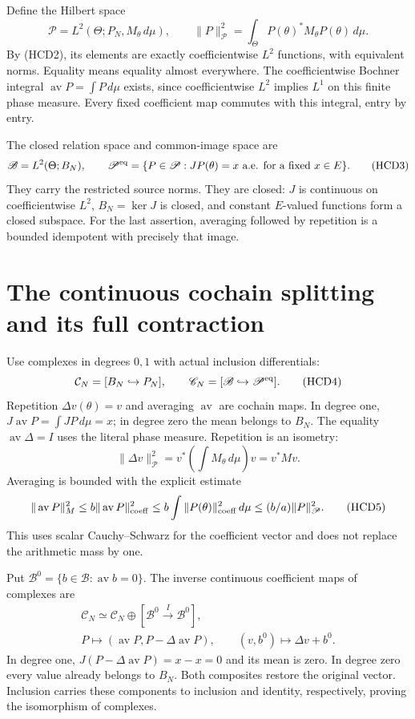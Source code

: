 \documentclass[11pt]{article}
\newcommand{\av}{\operatorname{av}}
\begin{document}
Define the Hilbert space
\[
 \mathscr P=L^2(\Theta;P_N,M_\theta\,d\mu),\qquad
 \|P\|_{\mathscr P}^2=\int_\Theta P(\theta)^*M_\theta
 P(\theta)\,d\mu.
\]
By (HCD2), its elements are exactly coefficientwise $L^2$
functions, with equivalent norms. Equality means equality
almost everywhere. The coefficientwise Bochner integral
$\av P=\int P\,d\mu$ exists, since coefficientwise $L^2$
implies $L^1$ on this finite phase measure. Every fixed
coefficient map commutes with this integral, entry by entry.

The closed relation space and common-image space are
\[
 \mathscr B=L^2(\Theta;B_N),\qquad
 \mathscr P^{\rm eq}
 =\{P\in\mathscr P:JP(\theta)=x\text{ a.e. for a fixed }x\in E\}.
 \tag{HCD3}
\]
They carry the restricted source norms. They are closed:
$J$ is continuous on coefficientwise $L^2$, $B_N=\ker J$
is closed, and constant $E$-valued functions form a closed
subspace. For the last assertion, averaging followed by
repetition is a bounded idempotent with precisely that image.

\section{The continuous cochain splitting and its full contraction}

Use complexes in degrees $0,1$ with actual inclusion differentials:
\[
 \mathcal C_N=[B_N\hookrightarrow P_N],\qquad
 \mathscr C_N=[\mathscr B\hookrightarrow\mathscr P^{\rm eq}].
 \tag{HCD4}
\]
Repetition $\Delta v(\theta)=v$ and averaging $\av$ are cochain
maps. In degree one, $J\av P=\int JP\,d\mu=x$; in degree
zero the mean belongs to $B_N$. The equality $\av\Delta=I$
uses the literal phase measure. Repetition is an isometry:
\[
 \|\Delta v\|_{\mathscr P}^2
 =v^*\left(\int M_\theta\,d\mu\right)v=v^*Mv.
\]
Averaging is bounded with the explicit estimate
\[
 \|\av P\|_M^2
 \le b\|\av P\|_{\rm coeff}^2
 \le b\int\|P(\theta)\|_{\rm coeff}^2\,d\mu
 \le (b/a)\|P\|_{\mathscr P}^2.
 \tag{HCD5}
\]
This uses scalar Cauchy--Schwarz for the coefficient vector
and does not replace the arithmetic mass by one.

Put $\mathscr B^0=\{b\in\mathscr B:\av b=0\}$. The inverse
continuous coefficient maps of complexes are
\[
 \begin{gathered}
 \mathscr C_N\simeq
 \mathcal C_N\oplus[\mathscr B^0\xrightarrow{I}\mathscr B^0],\\
 P\longmapsto(\av P,P-\Delta\av P),\qquad
 (v,b^0)\longmapsto\Delta v+b^0.
 \end{gathered}
 \tag{HCD6}
\]
In degree one, $J(P-\Delta\av P)=x-x=0$ and its mean is
zero. In degree zero every value already belongs to $B_N$.
Both composites restore the original vector. Inclusion
carries these components to inclusion and identity,
respectively, proving the isomorphism of complexes.
\end{document}
